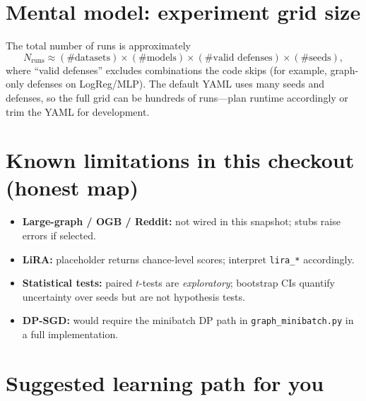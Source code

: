 \documentclass[11pt,a4paper]{article}
\begin{document}
\section{Mental model: experiment grid size}

The total number of runs is approximately
\[
N_{\text{runs}} \approx
(\#\text{datasets}) \times (\#\text{models}) \times (\#\text{valid defenses}) \times (\#\text{seeds}),
\]
where ``valid defenses'' excludes combinations the code skips (for example, graph-only defenses on LogReg/MLP). The default YAML uses many seeds and defenses, so the full grid can be hundreds of runs---plan runtime accordingly or trim the YAML for development.

\section{Known limitations in this checkout (honest map)}

\begin{itemize}
  \item \textbf{Large-graph / OGB / Reddit:} not wired in this snapshot; stubs raise errors if selected.
  \item \textbf{LiRA:} placeholder returns chance-level scores; interpret \texttt{lira\_*} accordingly.
  \item \textbf{Statistical tests:} paired $t$-tests are \emph{exploratory}; bootstrap CIs quantify uncertainty over seeds but are not hypothesis tests.
  \item \textbf{DP-SGD:} would require the minibatch DP path in \texttt{graph\_minibatch.py} in a full implementation.
\end{itemize}

\section{Suggested learning path for you}
\end{document}
